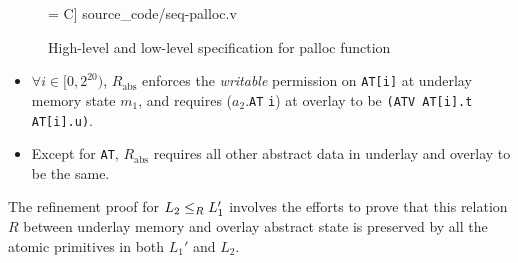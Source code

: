 \begin{figure}[t]\centering
\begin{minipage}{0.55\textwidth}
 = C] {source_code/seq-palloc.v} 
\end{minipage}
\caption{High-level and low-level specification for palloc function}
\label{fig:palloc:spec}
\hrulefill
\end{figure}




\begin{itemize}%
\item $\forall i \in [0, 2^{20})$, $R_\text{abs}$ enforces the {\em writable}
permission on \verb"AT[i]" at underlay memory state $m_1$, and requires
($a_2$.\verb"AT"  \verb"i") at overlay to be
\verb"(ATV AT[i].t AT[i].u)".

\item Except for \verb"AT", $R_\text{abs}$ requires all other abstract data in
underlay and overlay to be the same.
\end{itemize}
The refinement proof for $L_2 \le_{R} L_1'$ involves the efforts to
prove that this relation $R$ between underlay memory and overlay
abstract state is preserved by all the atomic primitives in both $L_1'$ and $L_2$.

